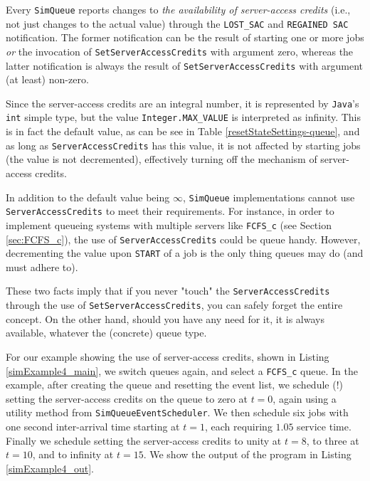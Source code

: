 \documentclass[12pt]{book}
\begin{document}
Every \lstinline|SimQueue| reports
  changes to {\em the availability of server-access credits\/}
  (i.e., not just changes to the actual value)
  through the \lstinline|LOST_SAC|
  and \lstinline|REGAINED SAC|
  notification.
The former notification can be the result of
  starting one or more jobs
  {\em or\/}
  the invocation of \lstinline|SetServerAccessCredits|
  with argument zero,
  whereas the latter notification is always
  the result of \lstinline|SetServerAccessCredits|
  with argument (at least) non-zero.

Since the server-access credits are an integral number,
  it is represented by \lstinline|Java|'s
  \lstinline|int| simple type,
  but the value
  \lstinline|Integer.MAX_VALUE|
  is interpreted as infinity.
This is in fact the default value,
  as can be see in Table \ref{resetStateSettings-queue},
  and as long as \lstinline|ServerAccessCredits|
  has this value,
  it is not affected by starting jobs
  (the value is not decremented),
  effectively turning off the mechanism of
  server-access credits.

In addition to the default value being $\infty$,
  \lstinline|SimQueue| implementations
  cannot use \lstinline|ServerAccessCredits|
  to meet their requirements.
For instance, in order to implement queueing
  systems with multiple servers like
  \lstinline|FCFS_c|
  (see Section \ref{sec:FCFS_c}),
  the use of
  \lstinline|ServerAccessCredits|
  could be queue handy.
However, decrementing the value upon \lstinline|START|
  of a job is the only thing queues may do
  (and must adhere to).

These two facts imply that
  if you never "touch"
  the \lstinline|ServerAccessCredits|
  through the use of
  \lstinline|SetServerAccessCredits|,
  you can safely forget the entire concept.
On the other hand,
  should you have any need for it,
  it is always available,
  whatever the (concrete) queue type.

For our example showing the use of server-access credits,
  shown in Listing \ref{simExample4_main},
  we switch queues again,
  and select a \lstinline|FCFS_c| queue.
In the example, after creating the queue
  and resetting the event list,
  we schedule (!) setting the server-access credits
  on the queue to zero at $t=0$,
  again using a utility method
  from \lstinline|SimQueueEventScheduler|.
We then schedule six jobs
  with one second inter-arrival time
  starting at $t=1$,
  each requiring $1.05$ service time.
Finally we schedule setting the server-access credits
  to unity at $t=8$,
  to three at $t=10$,
  and to infinity at $t=15$.
We show the output of the program in
  Listing \ref{simExample4_out}.
\end{document}
